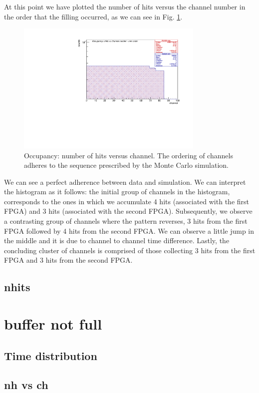 \documentclass[12pt]{article}
\begin{document}
At this point we have plotted the number of hits versus the channel number in the order that the filling occurred, as we can see in Fig. \ref{fig:2}.
\begin{figure}[!h]
\centering
\includegraphics[width =0.8\textwidth]{pdf/figure_00004_nhitsvschannel_roc_simulation_2}
\caption{Occupancy: number of hits versus channel. The ordering of channels adheres to the sequence prescribed by the Monte Carlo simulation.}
\label{fig:2}
\end{figure}
We can see a perfect adherence between data and simulation. We can interpret the histogram as it follows: the initial group of channels in the histogram,
corresponds to the ones in which we accumulate 4 hits (associated with the first FPGA) and 3 hits (associated with the second FPGA). 
Subsequently, we observe a contrasting group of channels where the pattern reverses, 3 hits from the first FPGA followed by 4 hits from the second FPGA.
We can observe a little jump in the middle and it is due to channel to channel time difference.
Lastly, the concluding cluster of channels is comprised of those collecting 3 hits from the first FPGA and 3 hits from the second FPGA.



\subsection{nhits}

\section{buffer not full}
\subsection{Time distribution}
\subsection{nh vs ch}
\end{document}
